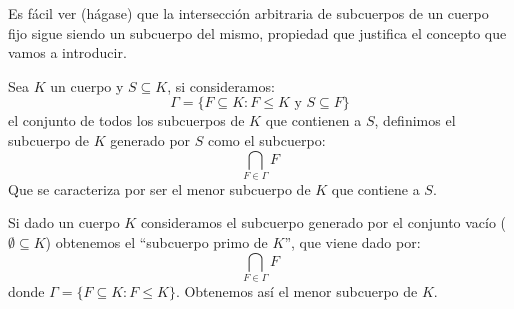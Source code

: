 \noindent
Es fácil ver (hágase) que la intersección arbitraria de subcuerpos de un cuerpo fijo sigue siendo un subcuerpo del mismo, propiedad que justifica el concepto que vamos a introducir.

\begin{definicion}
    Sea $K$ un cuerpo y $S\subseteq K$, si consideramos:
    \begin{equation*}
        \Gamma = \{F\subseteq K : F\leq K \text{\ y\ } S\subseteq F\}
    \end{equation*}
    el conjunto de todos los subcuerpos de $K$ que contienen a $S$, definimos el subcuerpo de $K$ generado por $S$ como el subcuerpo:
    \begin{equation*}
        \bigcap_{F\in \Gamma} F
    \end{equation*}
    Que se caracteriza por ser el menor subcuerpo de $K$ que contiene a $S$.
\end{definicion}

\begin{definicion}
    Si dado un cuerpo $K$ consideramos el subcuerpo generado por el conjunto vacío ($\emptyset \subseteq K$) obtenemos el ``subcuerpo primo de $K$'', que viene dado por:
    \begin{equation*}
        \bigcap_{F\in \Gamma} F
    \end{equation*}
    donde $\Gamma = \{F\subseteq K : F\leq K\}$. Obtenemos así el menor subcuerpo de $K$.
\end{definicion}


